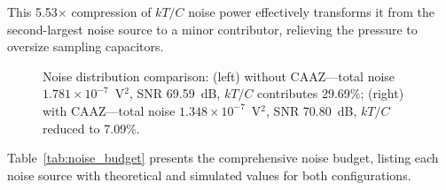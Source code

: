 \documentclass[journal]{IEEEtran}
\begin{document}
This 5.53$\times$ compression of $kT/C$ noise power effectively transforms it from the second-largest noise source to a minor contributor, relieving the pressure to oversize sampling capacitors.

\begin{figure}[!t]
\centering
{}
\caption{Noise distribution comparison: (left) without CAAZ---total noise $1.781 \times 10^{-7}$~V$^2$, SNR 69.59~dB, $kT/C$ contributes 29.69\%; (right) with CAAZ---total noise $1.348 \times 10^{-7}$~V$^2$, SNR 70.80~dB, $kT/C$ reduced to 7.09\%.}
\label{fig:noise_pie}
\end{figure}

Table~\ref{tab:noise_budget} presents the comprehensive noise budget, listing each noise source with theoretical and simulated values for both configurations.
\end{document}
